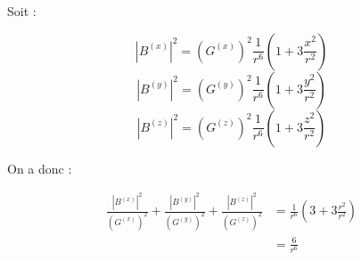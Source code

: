 \documentclass[a4paper,11pt]{article}
\begin{document}
Soit :

\[
\left|B^{(x)}\right|^2 = \left(G^{(x)}\right)^2\frac{1}{r^6}\left(1 + 3 \frac{x^2}{r^2}\right)
\]
\[
\left|B^{(y)}\right|^2 = \left(G^{(y)}\right)^2\frac{1}{r^6}\left(1 + 3 \frac{y^2}{r^2}\right)
\]
\[
\left|B^{(z)}\right|^2 = \left(G^{(z)}\right)^2\frac{1}{r^6}\left(1 + 3 \frac{z^2}{r^2}\right)
\]

On a donc : 

\begin{align}
\frac{\left|B^{(x)}\right|^2}{\left(G^{(x)}\right)^2} + 
\frac{\left|B^{(y)}\right|^2}{\left(G^{(y)}\right)^2} + 
\frac{\left|B^{(z)}\right|^2}{\left(G^{(z)}\right)^2} &= \frac{1}{r^6}\left(3 + 3 \frac{r^2}{r^2}\right)\\
&= \frac{6}{r^6}
\end{align}
\end{document}
